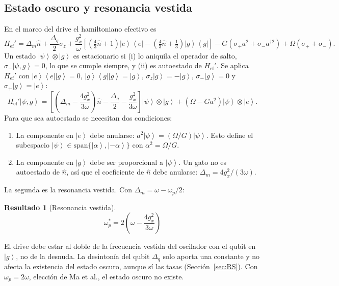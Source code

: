 \documentclass[11pt,a4paper]{article}
\newcommand{\ket}[1]{\left|#1\right\rangle}
\newcommand{\bra}[1]{\left\langle#1\right|}
\newcommand{\spl}{\sigma_{+}}
\newcommand{\smi}{\sigma_{-}}
\newcommand{\Pe}{\ket{e}\!\bra{e}}
\newcommand{\Pg}{\ket{g}\!\bra{g}}
\newcommand{\hn}{\hat n}
\newcommand{\Href}{H_{\mathrm{ef}}}
\newcommand{\wps}{\omega_p^{*}}
\theoremstyle{definition}
\newtheorem{resultado}{Resultado}
\begin{document}
\label{sec:codigo}

\subsection{Estado oscuro y resonancia vestida}
\label{sec:oscuro}

En el marco del drive el hamiltoniano efectivo es
\begin{equation}
\Href'=\Delta_m\hn+\frac{\Delta_q}{2}\sigma_z+\frac{g_x^2}{\omega}\left[\left(\tfrac43\hn+1\right)\Pe-\left(\tfrac43\hn+\tfrac13\right)\Pg\right]-G\left(\spl a^2+\smi a^{\dagger2}\right)+\Omega(\spl+\smi).
\label{eq:Hefp}
\end{equation}
Un estado $\ket{\psi}\otimes\ket{g}$ es estacionario si (i) lo aniquila el operador de salto, $\smi\ket{\psi,g}=0$, lo que se cumple siempre, y (ii) es autoestado de $\Href'$. Se aplica $\Href'$ con $\Pe\ket{g}=0$, $\Pg\ket{g}=\ket{g}$, $\sigma_z\ket{g}=-\ket{g}$, $\smi\ket{g}=0$ y $\spl\ket{g}=\ket{e}$:
\begin{equation}
\Href'\ket{\psi,g}=\left[\left(\Delta_m-\frac{4g_x^2}{3\omega}\right)\hn-\frac{\Delta_q}{2}-\frac{g_x^2}{3\omega}\right]\ket{\psi}\otimes\ket{g}+\left(\Omega-Ga^2\right)\ket{\psi}\otimes\ket{e}.
\end{equation}
Para que sea autoestado se necesitan dos condiciones:
\begin{enumerate}
\item La componente en $\ket{e}$ debe anularse: $a^2\ket{\psi}=(\Omega/G)\ket{\psi}$. Esto define el subespacio $\ket{\psi}\in\mathrm{span}\{\ket{\alpha},\ket{-\alpha}\}$ con $\alpha^2=\Omega/G$.
\item La componente en $\ket{g}$ debe ser proporcional a $\ket{\psi}$. Un gato no es autoestado de $\hn$, así que el coeficiente de $\hn$ debe anularse: $\Delta_m=4g_x^2/(3\omega)$.
\end{enumerate}
La segunda es la resonancia vestida. Con $\Delta_m=\omega-\omega_p/2$:
\begin{resultado}[Resonancia vestida]
\begin{equation}
\boxed{\wps=2\left(\omega-\frac{4g_x^2}{3\omega}\right)}
\label{eq:wps}
\end{equation}
\end{resultado}
El drive debe estar al doble de la frecuencia vestida del oscilador con el qubit en $\ket{g}$, no de la desnuda. La desintonía del qubit $\Delta_q$ solo aporta una constante y no afecta la existencia del estado oscuro, aunque sí las tasas (Sección~\ref{sec:RS}). Con $\omega_p=2\omega$, elección de Ma et al., el estado oscuro no existe.
\end{document}
